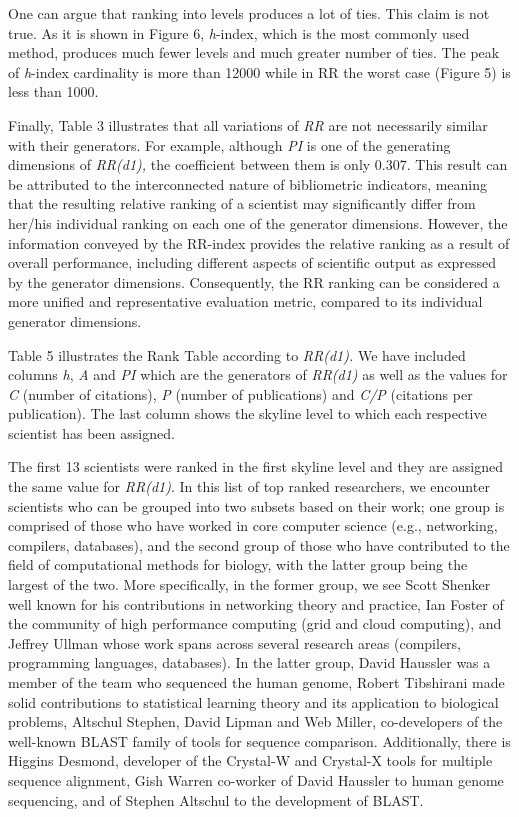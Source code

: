 One can argue that ranking into levels produces a lot of ties. This
claim is not true. As it is shown in Figure 6, \emph{h}-index, which is
the most commonly used method, produces much fewer levels and much
greater number of ties. The peak of \emph{h}-index cardinality is more
than 12000 while in RR the worst case (Figure 5) is less than 1000.

Finally, Table 3 illustrates that all variations of \emph{RR} are not
necessarily similar with their gene­rators. For example, although
\emph{PI} is one of the generating dimensions of \emph{RR(d1),} the
coefficient between them is only 0.307. This result can be attributed to
the interconnected nature of bibli­ometric indicators, meaning that the
resulting relative ranking of a scientist may significantly differ from
her/his individual ranking on each one of the generator dimensions.
However, the information conveyed by the RR-index provides the relative
ranking as a result of overall performance, including different aspects
of scientific output as expressed by the generator dimensions.
Consequently, the RR ranking can be considered a more unified and
repre­sentative evaluation metric, compared to its individual generator
dimensions.

Table 5 illustrates the Rank Table according to \emph{RR(d1).} We have
included columns \emph{h}, \emph{A} and \emph{PI} which are the
generators of \emph{RR(d1)} as well as the values for \emph{C} (number
of citations), \emph{P} (num­ber of publications) and \emph{C/P}
(citations per publication). The last column shows the skyline level to
which each respective scientist has been assigned.

The first 13 scientists were ranked in the first skyline level and they
are assigned the same value for \emph{RR(d1)}. In this list of top
ranked researchers, we encounter scientists who can be grouped into two
subsets based on their work; one group is comprised of those who have
worked in core computer science (e.g., networking, compilers,
databases), and the second group of those who have contributed to the
field of computational methods for biology, with the latter group being
the largest of the two. More specifically, in the former group, we see
Scott Shenker well known for his contributions in networking theory and
practice, Ian Foster of the community of high performance computing
(grid and cloud computing), and Jeffrey Ullman whose work spans across
several research areas (compilers, programming languages, databases). In
the latter group, David Haussler was a member of the team who sequenced
the human genome, Robert Tibshirani made solid contributions to
statistical learning theory and its application to biological problems,
Altschul Stephen, David Lipman and Web Miller, co-developers of the
well-known BLAST family of tools for sequence comparison. Additionally,
there is Higgins Desmond, developer of the Crystal-W and Crystal-X tools
for multiple se­quence alignment, Gish Warren co-worker of David
Haussler to human genome sequencing, and of Stephen Altschul to the
development of BLAST.

